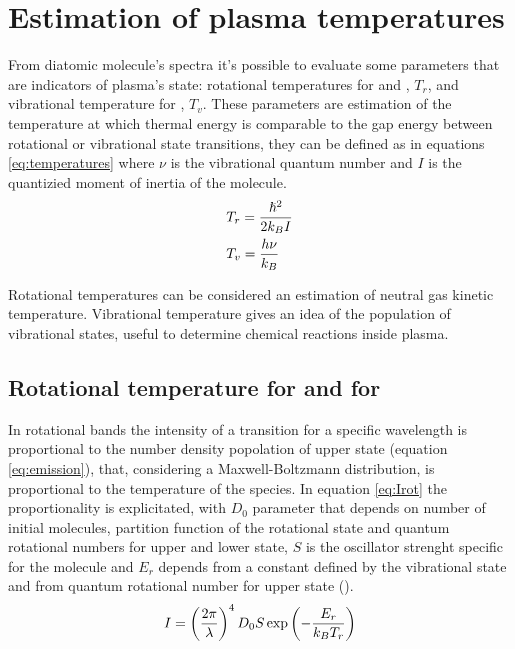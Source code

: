 \section{Estimation of plasma temperatures}
From diatomic molecule's spectra it's possible to evaluate some parameters that are indicators of plasma's state: rotational temperatures for  and , $T_{r}$, and vibrational temperature for , $T_{v}$.
These parameters are estimation of the temperature at which thermal energy is comparable to the gap energy between rotational or vibrational state transitions, they can be defined as in equations \ref{eq:temperatures} where $\nu$ is the vibrational quantum number and $I$ is the quantizied moment of inertia of the molecule.
\begin{equation}
 \centering
 \begin{split}
  &T_{r} = \frac{\hslash^2}{2 k_{B} I}\\
  &T_{v} = \frac{h \nu}{k_{B}}
 \end{split}
 \label{eq:temperatures}
\end{equation}

Rotational temperatures can be considered an estimation of neutral gas kinetic temperature. Vibrational temperature gives an idea of the population of vibrational states, useful to determine chemical reactions inside plasma.

\subsection{Rotational temperature for  and for }
In rotational bands the intensity of a transition for a specific wavelength is proportional to the number density popolation of upper state (equation \ref{eq:emission}), that, considering a Maxwell-Boltzmann distribution, is proportional to the temperature of the species. In equation \ref{eq:Irot} the proportionality is explicitated, with $D_{0}$ parameter that depends on number of initial molecules, partition function of the rotational state and quantum rotational numbers for upper and lower state, $S$ is the oscillator strenght specific for the molecule and $E_{r}$ depends from a constant defined by the vibrational state and from quantum rotational number for upper state (\cite{MOON2003249}).
\begin{equation}
 \centering
 I = \left(\frac{2 \pi}{\lambda}\right)^4 D_0 S \exp\left(-\frac{E_r}{k_B T_r}\right)
 \label{eq:Irot}
\end{equation}

